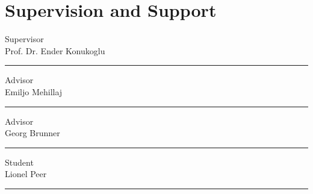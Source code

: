 \documentclass[a4paper]{article}
\begin{document}
\section{Supervision and Support}
Supervisor\\
Prof. Dr. Ender Konukoglu \hrule
\vspace{1cm}

Advisor \\
Emiljo Mehillaj \hrule
\vspace{1cm}


Advisor \\
Georg Brunner \hrule
\vspace{1cm}


Student \\
Lionel Peer \hrule
\vspace{1cm}


\printbibliography[title=References]
\end{document}

